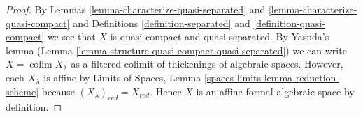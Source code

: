 \documentclass{stacks-project}
\theoremstyle{plain}
\theoremstyle{definition}
\theoremstyle{remark}
\numberwithin{equation}{subsection}
\def\colim{\mathop{\mathrm{colim}}\nolimits}
\begin{document}
\begin{proof}
By Lemmas \ref{lemma-characterize-quasi-separated} and
\ref{lemma-characterize-quasi-compact} and
Definitions \ref{definition-separated} and \ref{definition-quasi-compact}
we see that $X$ is quasi-compact and quasi-separated.
By Yasuda's lemma (Lemma \ref{lemma-structure-quasi-compact-quasi-separated})
we can write $X = \colim X_\lambda$ as a filtered colimit
of thickenings of algebraic spaces. However, each $X_\lambda$
is affine by Limits of Spaces, Lemma
\ref{spaces-limits-lemma-reduction-scheme}
because $(X_\lambda)_{red} = X_{red}$.
Hence $X$ is an affine formal algebraic space by definition.
\end{proof}
\end{document}
